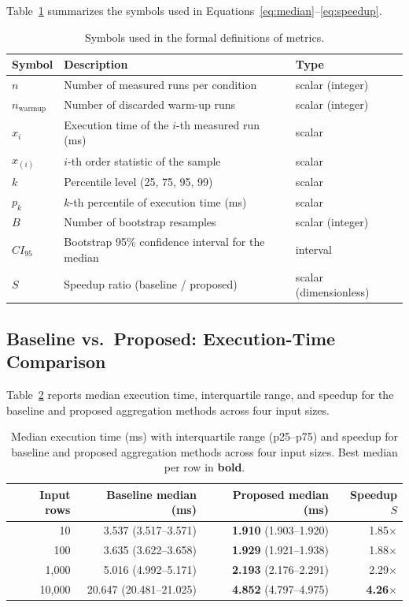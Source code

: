 Table~\ref{tab:notation} summarizes the symbols used in Equations~\eqref{eq:median}--\eqref{eq:speedup}.

\begin{table}[htbp]
\centering
\caption{Symbols used in the formal definitions of metrics.}
\label{tab:notation}
\begin{tabular}{lll}
\toprule
Symbol & Description & Type \\
\midrule
$n$ & Number of measured runs per condition & scalar (integer) \\
$n_{\text{warmup}}$ & Number of discarded warm-up runs & scalar (integer) \\
$x_i$ & Execution time of the $i$-th measured run (ms) & scalar \\
$x_{(i)}$ & $i$-th order statistic of the sample & scalar \\
$k$ & Percentile level (25, 75, 95, 99) & scalar \\
$p_k$ & $k$-th percentile of execution time (ms) & scalar \\
$B$ & Number of bootstrap resamples & scalar (integer) \\
$CI_{95}$ & Bootstrap 95\% confidence interval for the median & interval \\
$S$ & Speedup ratio (baseline / proposed) & scalar (dimensionless) \\
\bottomrule
\end{tabular}
\end{table}

\subsection{Baseline vs.\ Proposed: Execution-Time Comparison}
\label{sec:comparison}

Table~\ref{tab:main} reports median execution time, interquartile range, and speedup for the baseline and proposed aggregation methods across four input sizes.

\begin{table}[htbp]
\centering
\caption{Median execution time (ms) with interquartile range (p25--p75) and speedup for baseline and proposed aggregation methods across four input sizes. Best median per row in \textbf{bold}.}
\label{tab:main}
\begin{tabular}{rrrr}
\toprule
Input rows & Baseline median (ms) & Proposed median (ms) & Speedup $S$ \\
\midrule
10     & 3.537 (3.517--3.571)   & \textbf{1.910} (1.903--1.920) & 1.85$\times$ \\
100    & 3.635 (3.622--3.658)   & \textbf{1.929} (1.921--1.938) & 1.88$\times$ \\
1{,}000 & 5.016 (4.992--5.171) & \textbf{2.193} (2.176--2.291) & 2.29$\times$ \\
10{,}000 & 20.647 (20.481--21.025) & \textbf{4.852} (4.797--4.975) & \textbf{4.26}$\times$ \\
\bottomrule
\end{tabular}
\end{table}


